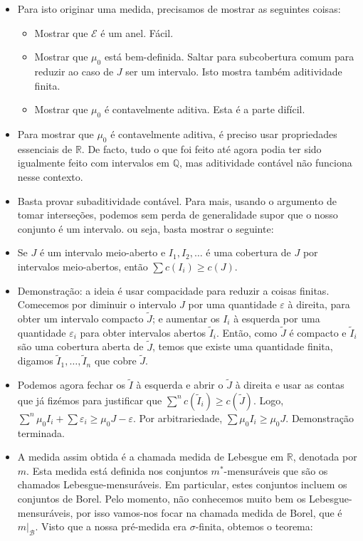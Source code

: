 \documentclass{article}
\newcommand{\R}{\mathbb{R}}
\newcommand{\Q}{\mathbb{Q}}
\begin{document}
\begin{itemize}
\item Para isto originar uma medida, precisamos de mostrar as seguintes coisas:
\begin{itemize}
\item Mostrar que $\mathcal E$ é um anel. Fácil.
\item Mostrar que $\mu_0$ está bem-definida. Saltar para subcobertura comum para reduzir ao caso de $J$ ser um intervalo. Isto mostra também aditividade finita.
\item Mostrar que $\mu_0$ é contavelmente aditiva. Esta é a parte difícil.
\end{itemize}
\item Para mostrar que $\mu_0$ é contavelmente aditiva, é preciso usar propriedades essenciais de $\R$. De facto, tudo o que foi feito até agora podia ter sido igualmente feito com intervalos em $\Q$, mas aditividade contável não funciona nesse contexto.
\item Basta provar subaditividade contável. Para mais, usando o argumento de tomar interseções, podemos sem perda de generalidade supor que o nosso conjunto é um intervalo. ou seja, basta mostrar o seguinte:
\item Se $J$ é um intervalo meio-aberto e $I_1, I_2, \dots$ é uma cobertura de $J$ por intervalos meio-abertos, então $\sum c(I_i) \geq c(J)$.
\item Demonstração: a ideia é usar compacidade para reduzir a coisas finitas. Comecemos por diminuir o intervalo $J$ por uma quantidade $\varepsilon$ à direita, para obter um intervalo compacto $\tilde J$; e aumentar os $I_i$ à esquerda por uma quantidade $\varepsilon_i$ para obter intervalos abertos $\tilde I_i$. Então, como $\tilde J$ é compacto e $\tilde I_i$ são uma cobertura aberta de $\tilde J$, temos que existe uma quantidade finita, digamos $\tilde I_1, \dots, \tilde I_n$ que cobre $\tilde J$.
\item Podemos agora fechar os $\tilde I$ à esquerda e abrir o $\tilde J$ à direita e usar as contas que já fizémos para justificar que $\sum^n c(\tilde I_i) \geq c(\tilde J)$. Logo, $\sum^n \mu_0 I_i + \sum \varepsilon_i \geq \mu_0 J - \varepsilon$. Por arbitrariedade, $\sum \mu_0 I_i \geq \mu_0 J$. Demonstração terminada.
\item A medida assim obtida é a chamada medida de Lebesgue em $\R$, denotada por $m$. Esta medida está definida nos conjuntos $m^*$-mensuráveis que são os chamados Lebesgue-mensuráveis. Em particular, estes conjuntos incluem os conjuntos de Borel. Pelo momento, não conhecemos muito bem os Lebesgue-mensuráveis, por isso vamos-nos focar na chamada medida de Borel, que é $m|_{\mathcal B}$. Visto que a nossa pré-medida era $\sigma$-finita, obtemos o teorema:

\end{itemize}
\end{document}
